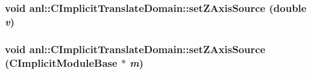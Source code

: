 \label{classanl_1_1CImplicitTranslateDomain_afc1d80f04ed101a3a1d80482490f3fd6}
\hypertarget{classanl_1_1CImplicitTranslateDomain_aba8ba496883031816d86f34d34ba4681}{
\subsubsection[{setZAxisSource}]{\setlength{\rightskip}{0pt plus 5cm}void anl::CImplicitTranslateDomain::setZAxisSource (double {\em v})}}
\label{classanl_1_1CImplicitTranslateDomain_aba8ba496883031816d86f34d34ba4681}
\hypertarget{classanl_1_1CImplicitTranslateDomain_a86e353f20809847a3ff1c663643925e9}{
\subsubsection[{setZAxisSource}]{\setlength{\rightskip}{0pt plus 5cm}void anl::CImplicitTranslateDomain::setZAxisSource ({\bf CImplicitModuleBase} $\ast$ {\em m})}}
\label{classanl_1_1CImplicitTranslateDomain_a86e353f20809847a3ff1c663643925e9}


